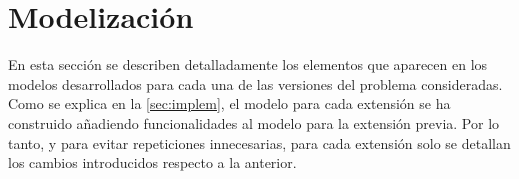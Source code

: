 
\section{Modelización} \label{sec:modelo}

En esta sección se describen detalladamente los elementos que aparecen en los 
modelos desarrollados para cada una de las versiones del problema 
consideradas. Como se explica en la \autoref{sec:implem}, el modelo para cada 
extensión se ha construido añadiendo funcionalidades al modelo para la 
extensión previa. Por lo tanto, y para evitar repeticiones innecesarias, para 
cada extensión solo se detallan los cambios introducidos respecto a la 
anterior.














\clearpage

